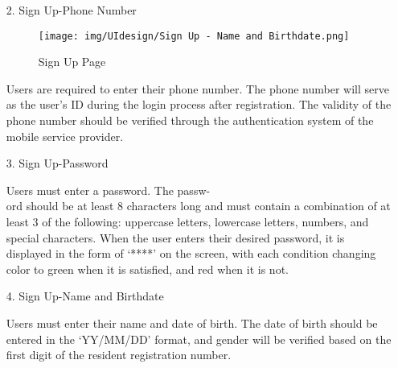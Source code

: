 \documentclass[conference]{IEEEtran}
\begin{document}
    
\begin{enumerate}
    \item[2.] Sign Up-Phone Number
    \begin{figure}[h]
\hspace{1.5cm}
\centering
\begin{minipage}{0.4\columnwidth}
    \texttt{[image: img/UIdesign/Sign Up - Name and Birthdate.png]}
    \caption{Sign Up Page}
\end{minipage}
\end{figure}
    
    Users are required to enter their phone number. The phone number will serve as the user’s ID during the login process after registration. The validity of the phone number should be verified through the authentication system of the mobile service provider. \\ 
\end{enumerate}

\begin{enumerate}
    \item[3.] Sign Up-Password
    
    Users must enter a password. The passw-\\ord should be at least 8 characters long and must contain a combination of at least 3 of the following: uppercase letters, lowercase letters, numbers, and special characters. When the user enters their desired password, it is displayed in the form of ‘****’ on the screen, with each condition changing color to green when it is satisfied, and red when it is not. \\ 
\end{enumerate}

\begin{enumerate}
    \item[4.] Sign Up-Name and Birthdate
    
    Users must enter their name and date of birth. The date of birth should be entered in the ‘YY/MM/DD’ format, and gender will be verified based on the first digit of the resident registration number. \\ 
\end{enumerate}

\clearpage
\end{document}
